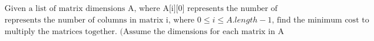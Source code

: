 \documentclass[preview]{standalone}
\begin{document}
\begin{center}
\begin{align*}&\text{Given a list of matrix dimensions A, where A[i][0] represents 
                                  the number of rows in matrix i and A[i][1]}\\&\text{represents the number of columns in matrix i, where } 
                                  0 \leq i \leq A.length - 1 \text{, find the minimum cost to}\\&\text{multiply the matrices together. 
                                  (Assume the dimensions for each matrix in A are valid for multiplication)}\end{align*}
\end{center}
\end{document}
